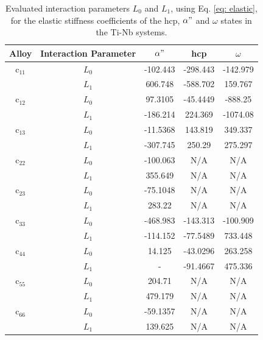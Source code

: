 \newpage
\begin{table}[H]
	\caption{Evaluated interaction parameters $L_0$ and $L_1$, using Eq. \ref{eq: elastic}, for the elastic stiffness coefficients of the hcp, $\alpha"$ and $\omega$ states in the Ti-Nb systems.}
	\centering
	\begin{tabular}{ c c c c c }
		\hline
		Alloy & Interaction Parameter & $\alpha"$ & hcp & $\omega$\\
		\hline
		c$_{11}$ & $L_{0}$ & -102.443 & -298.443 & -142.979 \\
		& $L_{1}$ & 606.748 & -588.702 & 159.767 \\
		c$_{12}$ & $L_{0}$ & 97.3105 & -45.4449 & -888.25 \\
		& $L_{1}$ & -186.214 & 224.369 & -1074.08 \\
		c$_{13}$ & $L_{0}$ & -11.5368 & 143.819 & 349.337 \\
		& $L_{1}$ & -307.745 & 250.29 & 275.297 \\
		c$_{22}$ & $L_{0}$ & -100.063 & N/A & N/A \\
		& $L_{1}$ & 355.649 & N/A & N/A \\
		c$_{23}$ & $L_{0}$ & -75.1048 & N/A & N/A \\
		& $L_{1}$ & 283.22 & N/A & N/A \\
		c$_{33}$ & $L_{0}$ & -468.983 & -143.313 & -100.909 \\
		& $L_{1}$ & -114.152 & -77.5489 & 733.448 \\
		c$_{44}$ & $L_{0}$ & 14.125 & -43.0296 & 263.258 \\
		& $L_{1}$ & - & -91.4667 & 475.336 \\
		c$_{55}$ & $L_{0}$ & 204.71 & N/A & N/A \\
		& $L_{1}$ & 479.179 & N/A & N/A \\
		c$_{66}$ & $L_{0}$ & -59.1357 & N/A & N/A \\
		& $L_{1}$ & 139.625 & N/A & N/A \\
		\hline
	\end{tabular}
	\label{Ch7-table:intpara}
\end{table}
\clearpage

